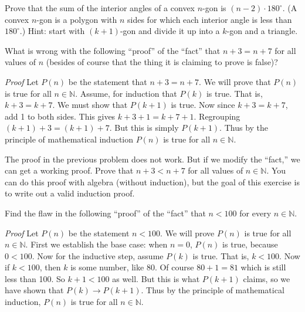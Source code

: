 \documentclass[11pt,]{book}
\makeatletter
\theoremstyle{ptxplainnotitle}
\theoremstyle{ptxplaintitle}
\renewcommand*{\proofname}{Proof}
\renewenvironment{proof}[1][\proofname]{\par
  \pushQED{\qed}%
  \normalfont \topsep6\p@\@plus6\p@\relax
  \trivlist
  \item\relax
    {\itshape
    #1\@addpunct{.}}\hspace\labelsep\ignorespaces
}{%
  \popQED\endtrivlist\@endpefalse
}
\theoremstyle{ptxdefinitionnotitle}
\theoremstyle{ptxdefinitiontitle}
\theoremstyle{ptxdefinitionnotitle}
\theoremstyle{ptxdefinitiontitle}
\theoremstyle{ptxdefinitionnotitle}
\theoremstyle{ptxdefinitiontitle}
\theoremstyle{ptxdefinitiontitlenonumber}
\theoremstyle{ptxdefinitiontitlenonumber}
\numberwithin{equation}{chapter}
\newcommand{\N}{\mathbb N}
\newcommand{\imp}{\rightarrow}
\newcommand{\lt}{<}
\makeatother
\begin{document}
\begin{divisionexercise}{11}\hypertarget{exercise-64}{}
\hypertarget{p-607}{}%
Prove that the sum of the interior angles of a convex \(n\)-gon is \((n-2)\cdot 180^\circ\).  (A convex \(n\)-gon is a polygon with \(n\) sides for which each interior angle is less than \(180^\circ\).)  Hint: start with \((k+1)\)-gon and divide it up into a \(k\)-gon and a triangle.%
\end{divisionexercise}%
\begin{divisionexercise}{12}\hypertarget{exercise-65}{}
\hypertarget{p-613}{}%
What is wrong with the following ``proof'' of the ``fact'' that \(n+3 = n+7\) for all values of \(n\) (besides of course that the thing it is claiming to prove is false)?%
\begin{proof}\hypertarget{proof-11}{}
\hypertarget{p-614}{}%
Let \(P(n)\) be the statement that \(n + 3 = n + 7\). We will prove that \(P(n)\) is true for all \(n \in \N\). Assume, for induction that \(P(k)\) is true. That is, \(k+3 = k+7\). We must show that \(P(k+1)\) is true. Now since \(k + 3 = k + 7\), add 1 to both sides. This gives \(k + 3 + 1 = k + 7 + 1\). Regrouping \((k+1) + 3 = (k+1) + 7\). But this is simply \(P(k+1)\). Thus by the principle of mathematical induction \(P(n)\) is true for all \(n \in \N\).%
\end{proof}
\end{divisionexercise}%
\begin{divisionexercise}{13}\hypertarget{exercise-66}{}
\hypertarget{p-616}{}%
The proof in the previous problem does not work. But if we modify the ``fact,'' we can get a working proof. Prove that \(n + 3 \lt  n + 7\) for all values of \(n \in \N\). You can do this proof with algebra (without induction), but the goal of this exercise is to write out a valid induction proof.%
\end{divisionexercise}%
\begin{divisionexercise}{14}\hypertarget{exercise-67}{}
\hypertarget{p-618}{}%
Find the flaw in the following ``proof'' of the ``fact'' that \(n \lt  100\) for every \(n \in \N\).%
\begin{proof}\hypertarget{proof-13}{}
\hypertarget{p-619}{}%
Let \(P(n)\) be the statement \(n \lt  100\). We will prove \(P(n)\) is true for all \(n \in \N\). First we establish the base case: when \(n = 0\), \(P(n)\) is true, because \(0 \lt  100\). Now for the inductive step, assume \(P(k)\) is true. That is, \(k \lt  100\). Now if \(k \lt  100\), then \(k\) is some number, like 80. Of course \(80+1 = 81\) which is still less than 100. So \(k +1 \lt  100\) as well. But this is what \(P(k+1)\) claims, so we have shown that \(P(k) \imp P(k+1)\). Thus by the principle of mathematical induction, \(P(n)\) is true for all \(n \in \N\).%
\end{proof}
\end{divisionexercise}%
\end{document}
